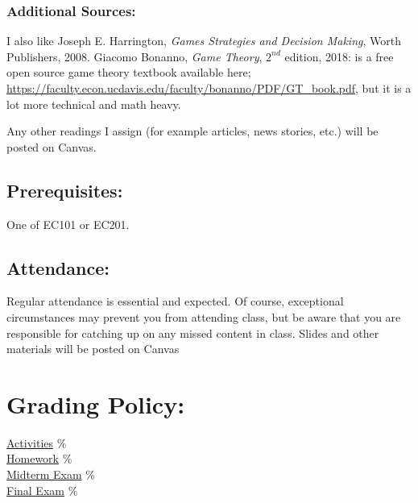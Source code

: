 \subsubsection*{Additional Sources:}

  I also like Joseph E. Harrington, \textit{Games Strategies and Decision Making}, Worth Publishers, 2008. Giacomo Bonanno, \textit{Game Theory}, $2^{nd}$ edition, 2018: is a free open source game theory textbook available here; \url{https://faculty.econ.ucdavis.edu/faculty/bonanno/PDF/GT_book.pdf}, but it is a lot more technical and math heavy.

 \noindent Any other readings I assign (for example articles, news stories, etc.) will be posted on Canvas.

\subsection*{Prerequisites:}

  One of EC101 or EC201.

\subsection*{Attendance:}

  Regular attendance is essential and expected. Of course, exceptional circumstances may prevent you from attending class, but be aware that you are responsible for catching up on any missed content in class. Slides and other materials will be posted on Canvas

\section{Grading Policy:} 

\begin{center} \begin{minipage}{3.8in}\begin{flushleft}
    \hyperlink{grading_activity}{Activities} \% \\
    \hyperlink{grading_HW}{Homework} \% \\
    \hyperlink{grading_exam}{Midterm Exam} \% \\
    \hyperlink{grading_exam}{Final Exam} \% \\
\end{flushleft}\end{minipage}\end{center}

